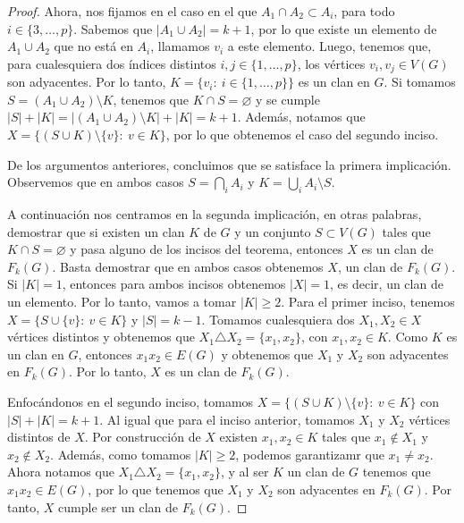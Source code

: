 \begin{proof}
    Ahora, nos fijamos en el caso en el que $A_1 \cap A_2 \subset A_i$, para
    todo $i\in \{3, \dots, p\}$. Sabemos que $|A_1 \cup A_2| = k+1$, por lo que
    existe un elemento de $A_1 \cup A_2$ que no est\'a en $A_i$, llamamos $v_i$
    a este elemento. Luego, tenemos que, para cualesquiera dos \'indices
    distintos $i, j \in \{1, \dots, p\}$, los v\'ertices $v_i, v_j \in V(G)$ son
    adyacentes. Por lo tanto, $K= \{v_i\colon\ i \in \{1, \dots, p\}\}$ es un
    clan en $G$. Si tomamos $S= (A_1 \cup A_2)\setminus K$, tenemos que $K \cap
    S = \varnothing$ y se cumple $|S| + |K|= |(A_1 \cup A_2)\setminus K| + |K| =
    k+1$. Adem\'as, notamos que $X = \{(S \cup K)\setminus \{v\}\colon\ v\in
    K\}$, por lo que obtenemos el caso del segundo inciso.

    De los argumentos anteriores, concluimos que se satisface la primera
    implicaci\'on. Observemos que en ambos casos $S = \bigcap\limits_{i} A_i$ y
    $K = \bigcup\limits_{i} A_i \setminus S$.
        
    A continuaci\'on nos centramos en la segunda implicaci\'on, en otras
    palabras, demostrar que si existen un clan $K$ de $G$ y un conjunto $S
    \subset V(G)$ tales que $K \cap S = \varnothing$ y pasa alguno de los
    incisos del teorema, entonces $X$ es un clan de $F_k(G)$. Basta demostrar
    que en ambos casos obtenemos $X$, un clan de $F_k(G)$. Si $|K| =1$, entonces
    para ambos incisos obtenemos $|X| =1$, es decir, un clan de un elemento. Por
    lo tanto, vamos a tomar $|K| \geq 2$. Para el primer inciso, tenemos $X = \{S
    \cup \{v\}\colon\ v \in K\}$ y $|S| = k-1$. Tomamos cualesquiera dos $X_1,
    X_2 \in X$ v\'ertices distintos y obtenemos que $X_1 \triangle X_2 =\{x_1,
    x_2\}$, con $x_1, x_2 \in K$. Como $K$ es un clan en $G$, entonces $x_1x_2
    \in E(G)$ y obtenemos que $X_1$ y $X_2$ son adyacentes en $F_k(G)$. Por lo
    tanto, $X$ es un clan de $F_k(G)$.

    Enfoc\'andonos en el segundo inciso, tomamos $X = \{(S\cup K) \setminus
    \{v\}\colon\ v \in K \}$ con $|S| + |K| = k+1$. Al igual que para el inciso
    anterior, tomamos $X_1$ y $X_2$ v\'ertices distintos de $X$. Por
    construcci\'on de $X$ existen $x_1, x_2 \in K$ tales que $x_1 \notin X_1$ y
    $x_2 \notin X_2$. Adem\'as, como tomamos $|K| \geq 2$, podemos garantizamr
    que $x_1 \neq x_2$. Ahora notamos que $X_1 \triangle X_2 = \{x_1, x_2\}$, y
    al ser $K$ un clan de $G$ tenemos que $x_1x_2 \in E(G)$, por lo que tenemos
    que $X_1$ y $X_2$ son adyacentes en $F_k(G)$. Por tanto, $X$ cumple ser un
    clan de $F_k(G)$.
\end{proof}
    
